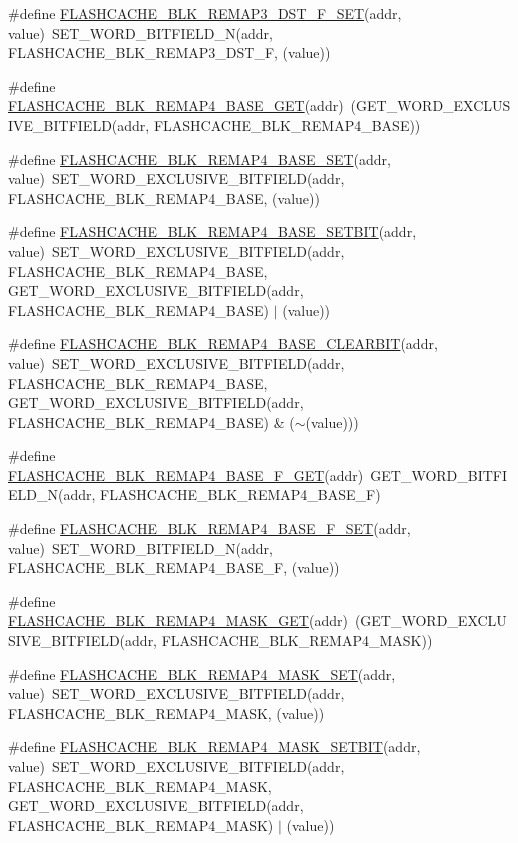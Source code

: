 \begin{DoxyCompactItemize}
\item 
\#define \hyperlink{a00549_abfd0c37a924bf3b1c1edf77f1d568414}{FLASHCACHE\_\-BLK\_\-REMAP3\_\-DST\_\-F\_\-SET}(addr, value)~SET\_\-WORD\_\-BITFIELD\_\-N(addr, FLASHCACHE\_\-BLK\_\-REMAP3\_\-DST\_\-F, (value))
\item 
\#define \hyperlink{a00549_a1bd7d4a06b4fb2c8720c02a06e0b7ccf}{FLASHCACHE\_\-BLK\_\-REMAP4\_\-BASE\_\-GET}(addr)~(GET\_\-WORD\_\-EXCLUSIVE\_\-BITFIELD(addr, FLASHCACHE\_\-BLK\_\-REMAP4\_\-BASE))
\item 
\#define \hyperlink{a00549_ae17e54cf4cac43f3d0de078960f2cac8}{FLASHCACHE\_\-BLK\_\-REMAP4\_\-BASE\_\-SET}(addr, value)~SET\_\-WORD\_\-EXCLUSIVE\_\-BITFIELD(addr, FLASHCACHE\_\-BLK\_\-REMAP4\_\-BASE, (value))
\item 
\#define \hyperlink{a00549_a8264b83541d902ba528787e76fffc64b}{FLASHCACHE\_\-BLK\_\-REMAP4\_\-BASE\_\-SETBIT}(addr, value)~SET\_\-WORD\_\-EXCLUSIVE\_\-BITFIELD(addr, FLASHCACHE\_\-BLK\_\-REMAP4\_\-BASE, GET\_\-WORD\_\-EXCLUSIVE\_\-BITFIELD(addr, FLASHCACHE\_\-BLK\_\-REMAP4\_\-BASE) $|$ (value))
\item 
\#define \hyperlink{a00549_a37ce7079f4aff0799751a7cfc61b2bd9}{FLASHCACHE\_\-BLK\_\-REMAP4\_\-BASE\_\-CLEARBIT}(addr, value)~SET\_\-WORD\_\-EXCLUSIVE\_\-BITFIELD(addr, FLASHCACHE\_\-BLK\_\-REMAP4\_\-BASE, GET\_\-WORD\_\-EXCLUSIVE\_\-BITFIELD(addr, FLASHCACHE\_\-BLK\_\-REMAP4\_\-BASE) \& ($\sim$(value)))
\item 
\#define \hyperlink{a00549_a7605fb01949bf189d9ae85c5bd3fdecc}{FLASHCACHE\_\-BLK\_\-REMAP4\_\-BASE\_\-F\_\-GET}(addr)~GET\_\-WORD\_\-BITFIELD\_\-N(addr, FLASHCACHE\_\-BLK\_\-REMAP4\_\-BASE\_\-F)
\item 
\#define \hyperlink{a00549_ad28047fbf9ddc65dec5b4c4503cd176d}{FLASHCACHE\_\-BLK\_\-REMAP4\_\-BASE\_\-F\_\-SET}(addr, value)~SET\_\-WORD\_\-BITFIELD\_\-N(addr, FLASHCACHE\_\-BLK\_\-REMAP4\_\-BASE\_\-F, (value))
\item 
\#define \hyperlink{a00549_ad794af94326391584683a0dc59125da0}{FLASHCACHE\_\-BLK\_\-REMAP4\_\-MASK\_\-GET}(addr)~(GET\_\-WORD\_\-EXCLUSIVE\_\-BITFIELD(addr, FLASHCACHE\_\-BLK\_\-REMAP4\_\-MASK))
\item 
\#define \hyperlink{a00549_ae596e5af3f3144fad36214869a3211a3}{FLASHCACHE\_\-BLK\_\-REMAP4\_\-MASK\_\-SET}(addr, value)~SET\_\-WORD\_\-EXCLUSIVE\_\-BITFIELD(addr, FLASHCACHE\_\-BLK\_\-REMAP4\_\-MASK, (value))
\item 
\#define \hyperlink{a00549_a2f6b9aff273d3835dcec731247992184}{FLASHCACHE\_\-BLK\_\-REMAP4\_\-MASK\_\-SETBIT}(addr, value)~SET\_\-WORD\_\-EXCLUSIVE\_\-BITFIELD(addr, FLASHCACHE\_\-BLK\_\-REMAP4\_\-MASK, GET\_\-WORD\_\-EXCLUSIVE\_\-BITFIELD(addr, FLASHCACHE\_\-BLK\_\-REMAP4\_\-MASK) $|$ (value))

\end{DoxyCompactItemize}
